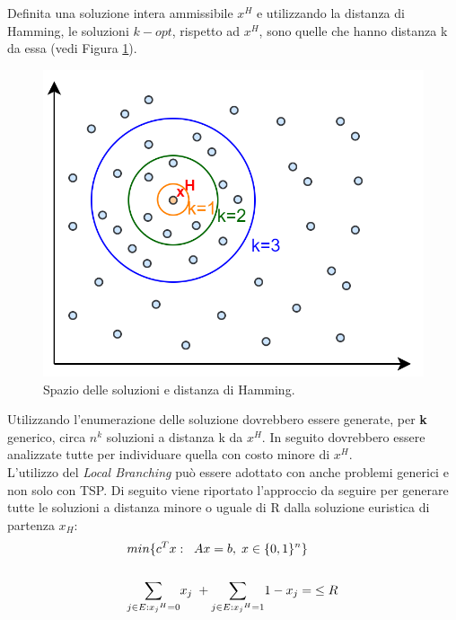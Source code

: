 Definita una soluzione intera ammissibile $x^H$ e utilizzando la distanza di Hamming, le soluzioni $k-opt$, rispetto ad $x^H$, sono quelle che hanno distanza k da essa (vedi Figura \ref{opt}).\\
\begin{figure}[h] 
\begin{center} 
  \includegraphics[scale=0.38]{Images/opt}
  \caption{\footnotesize{Spazio delle soluzioni e distanza di Hamming.}} \label{opt} 
\end{center} 
\end{figure}
Utilizzando l'enumerazione delle soluzione dovrebbero essere generate, per \textbf{k} generico, circa $n^k$ soluzioni a distanza k da $x^H$. In seguito dovrebbero essere analizzate tutte per individuare quella con costo minore di $x^H$.\\
L'utilizzo del \textit{Local Branching} può essere adottato con anche problemi generici e non solo con TSP. Di seguito viene riportato l'approccio da seguire per generare tutte le soluzioni a distanza minore o uguale di R dalla soluzione euristica di partenza $x_H$:
\begin{align}
& min \{ c^T x:\;\;Ax=b,\;x\in\{0,1\}^n\} \\ \notag \\
& \underset{j\in E:{x_j}^H=0}\sum{x_j}\;+ \underset{j\in E:{x_j}^H=1}\sum{1-x_j}=\; \leq R
\end{align}
